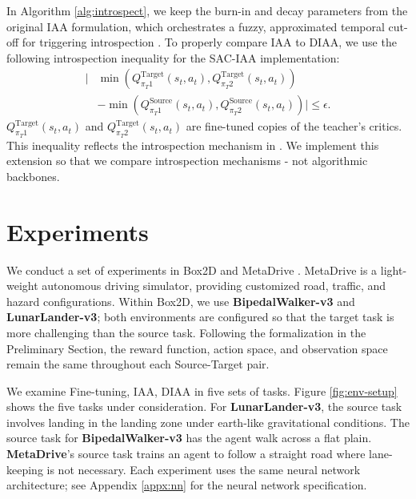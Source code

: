 \documentclass{article} %
\begin{document}
In Algorithm \ref{alg:introspect}, we keep the burn-in and decay parameters from the original IAA formulation, which orchestrates a fuzzy, approximated temporal cut-off for triggering introspection \cite{campbell2023introspective}. To properly compare IAA to DIAA, we use the following introspection inequality for the SAC-IAA implementation:
\begin{equation}
\label{eq:q-introspection-iaa}
\begin{split}
    | & \min(Q_{\pi_T 1}^{\text{Target}}(s_t,a_t), Q_{\pi_T 2}^{\text{Target}}(s_t,a_t)) \\
    & - \min(Q_{\pi_T 1}^{\text{Source}}(s_t,a_t), Q_{\pi_T 2}^{\text{Source}}(s_t,a_t))| \leq \epsilon.
\end{split}
\end{equation}$Q_{\pi_T 1}^{\text{Target}}(s_t,a_t)$ and $Q_{\pi_T 2}^{\text{Target}}(s_t,a_t)$ are fine-tuned copies of the teacher's critics. This inequality reflects the introspection mechanism in \citet{campbell2023introspective}. We implement this extension so that we compare introspection mechanisms - not algorithmic backbones. 

\section{Experiments}
\label{sec:experiments}

We conduct a set of experiments in Box2D and MetaDrive \citep{li2022metadrive, towersgym2024}. MetaDrive is a light-weight autonomous driving simulator, providing customized road, traffic, and hazard configurations. Within Box2D, we use \textbf{BipedalWalker-v3} and \textbf{LunarLander-v3}; both environments are configured so that the target task is more challenging than the source task. Following the formalization in the Preliminary Section, the reward function, action space, and observation space remain the same throughout each Source-Target pair. 

We examine Fine-tuning, IAA, DIAA in five sets of tasks. Figure \ref{fig:env-setup} shows the five tasks under consideration. For \textbf{LunarLander-v3}, the source task involves landing in the landing zone under earth-like gravitational conditions. The source task for \textbf{BipedalWalker-v3} has the agent walk across a flat plain. \textbf{MetaDrive}'s source task trains an agent to follow a straight road where lane-keeping is not necessary. Each experiment uses the same neural network architecture; see Appendix \ref{appx:nn} for the neural network specification.
\end{document}
